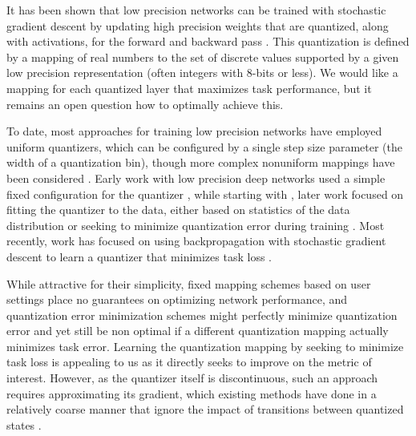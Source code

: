 \documentclass{article}
\begin{document}
It has been shown that low precision networks can be trained with stochastic gradient descent by updating high precision weights that are quantized, along with activations, for the forward and backward pass \citep{courbariaux2015binaryconnect, Esser11441}.
%
This quantization is defined by a mapping of real numbers to the set of discrete values supported by a given low precision representation (often integers with 8-bits or less).
%
We would like a mapping for each quantized layer that maximizes task performance,
but it remains an open question how to optimally achieve this.

To date, most approaches for training low precision networks have employed uniform quantizers, which can be configured by a single step size parameter (the width of a quantization bin), though more complex nonuniform mappings have been considered \citep{polino2018model}.
%
Early work with low precision deep networks used a simple fixed configuration for the quantizer \citep{hubara2016binarized,Esser11441},
while starting with \citet{rastegari2016xnor}, later work focused on fitting the quantizer to the data, either based on statistics of the data distribution \citep{li2016ternary,zhou2016dorefa,cai2017deep,mckinstry2018discovering} or seeking to minimize quantization error during training \citep{choi2018learning,zhang2018lq}.
%
Most recently, work has focused on using backpropagation with stochastic gradient descent to learn a quantizer that minimizes task loss \citep{DBLP:journals/corr/ZhuHMD16,mishra2017apprentice,choi2018pact,choi2018bridging,jung2018joint,baskin2018nice,polino2018model}.




While attractive for their simplicity, fixed mapping schemes based on user settings place no guarantees on optimizing network performance,
%
and quantization error minimization schemes might perfectly minimize quantization error and yet still be non optimal if a different quantization mapping actually minimizes task error.
%
Learning the quantization mapping by seeking to minimize task loss is appealing to us as it directly seeks to improve on the metric of interest. 
%
However, as the quantizer itself is discontinuous, such an approach requires approximating its gradient, which existing methods have done in a relatively coarse manner that ignore the impact of transitions between quantized states \citep{choi2018pact,choi2018bridging,jung2018joint}.
\end{document}
